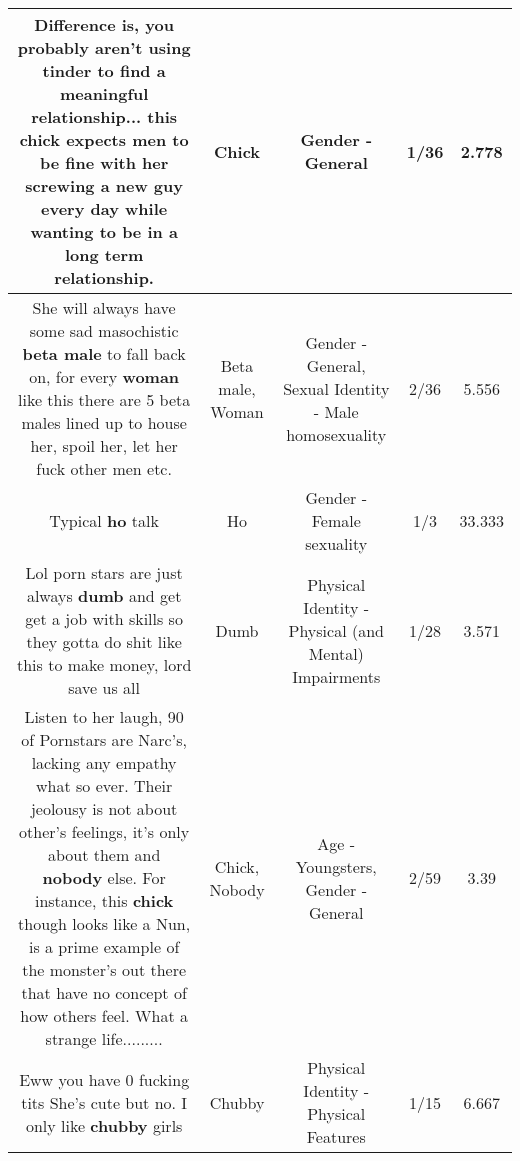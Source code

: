 \documentclass[11pt]{article}
\newlength\mylength
\begin{document}
\begin{center}
\begin{longtable}{|C{.65\mylength}|C{.30\mylength}|C{.12\mylength}|C{.12\mylength}|C{.12\mylength}|}
  \small Difference is, you probably aren't using tinder to find a meaningful relationship... this \textbf{chick} expects men to be fine with her screwing a new guy every day while wanting to be in a long term relationship.\normalsize   & Chick & Gender - General & 1/36 & 2.778 \\  \hline
  \small She will always have some sad masochistic \textbf{beta male} to fall back on, for every \textbf{woman} like this there are 5 beta males lined up to house her, spoil her, let her fuck other men etc.\normalsize   & Beta male, Woman & Gender - General, Sexual Identity - Male homosexuality & 2/36 & 5.556 \\  \hline
  \small Typical \textbf{ho} talk\normalsize   & Ho & Gender - Female sexuality & 1/3 & 33.333 \\  \hline
  \small Lol porn stars are just always \textbf{dumb} and get get a job with skills so they gotta do shit like this to make money, lord save us all\normalsize   & Dumb & Physical Identity - Physical (and Mental) Impairments & 1/28 & 3.571 \\  \hline
  \small Listen to her laugh, 90 of Pornstars are Narc's, lacking any empathy what so ever.  Their jeolousy is not about other's feelings, it's only about them and \textbf{nobody} else.  For instance, this \textbf{chick} though looks like a Nun, is a prime example of the monster's out there that have no concept of how others feel.  What a strange life.........\normalsize   & Chick, Nobody & Age - Youngsters, Gender - General & 2/59 & 3.39 \\  \hline
  \small Eww you have 0 fucking tits She's cute but no.   I only like \textbf{chubby} girls\normalsize   & Chubby & Physical Identity - Physical Features & 1/15 & 6.667 \\  \hline

\end{longtable}
\end{center}
\end{document}

